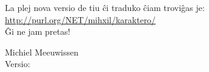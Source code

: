 \begin{minipage}[t]{\textwidth}

La plej nova versio de tiu ĉi traduko ĉiam troviĝas je:\\
\href{http://purl.org/NET/mihxil/karaktero/}{http://purl.org/NET/mihxil/karaktero/}\\

Ĝi ne jam pretas!

Michiel  Meeuwissen \\

Versio: \href{https://github.com/mihxil/karaktero}{}
\end{minipage}
